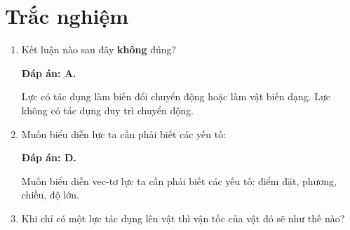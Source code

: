 \setcounter{section}{0}
\section{Trắc nghiệm}
\begin{enumerate}[label=\bfseries Câu \arabic*:]
	\item {}
	
	
	{Kết luận nào sau đây \textbf{không} đúng?
	}
	
	\hideall
	{		\textbf{Đáp án: A.}
		
		Lực có tác dụng làm biến đổi chuyển động hoặc làm vật biến dạng. Lực không có tác dụng duy trì chuyển động.
		
	}
	\item {}
	
	
	{Muốn biểu diễn lực ta cần phải biết các yếu tố:
	}
	
	\hideall
	{		\textbf{Đáp án: D.}
		
		Muốn biểu diễn vec-tơ lực ta cần phải biết các yếu tố: điểm đặt, phương, chiều, độ lớn.
		
	}
	\item {}
	
	
	{Khi chỉ có một lực tác dụng lên vật thì vận tốc của vật đó sẽ như thế nào?
	}
	

\end{enumerate}
